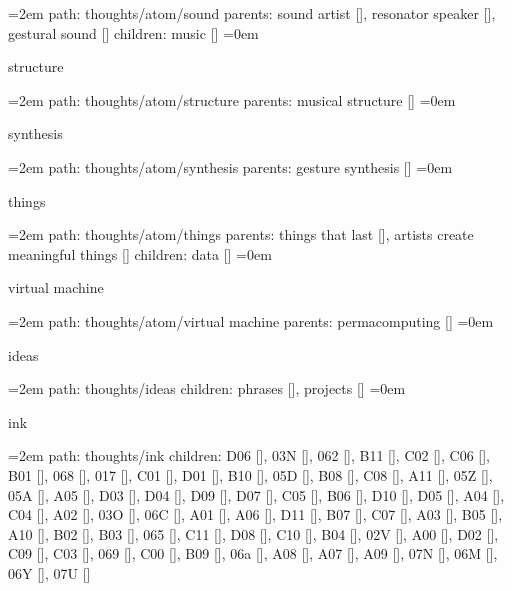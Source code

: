 \leftskip=2em
path: thoughts/atom/sound
\smallskip
parents:  sound artist [], resonator speaker [], gestural sound []
\smallskip
children: music []
\smallskip
\leftskip=0em
\par\endgroup
\bigskip
{}
structure
\smallskip
\par\begingroup
\leftskip=2em
path: thoughts/atom/structure
\smallskip
parents:  musical structure []
\smallskip
\leftskip=0em
\par\endgroup
\bigskip
{}
synthesis
\smallskip
\par\begingroup
\leftskip=2em
path: thoughts/atom/synthesis
\smallskip
parents:  gesture synthesis []
\smallskip
\leftskip=0em
\par\endgroup
\bigskip
{}
things
\smallskip
\par\begingroup
\leftskip=2em
path: thoughts/atom/things
\smallskip
parents:  things that last [], artists create meaningful things []
\smallskip
children: data []
\smallskip
\leftskip=0em
\par\endgroup
\bigskip
{}
virtual machine
\smallskip
\par\begingroup
\leftskip=2em
path: thoughts/atom/virtual machine
\smallskip
parents:  permacomputing []
\smallskip
\leftskip=0em
\par\endgroup
\bigskip
{}
ideas
\smallskip
\par\begingroup
\leftskip=2em
path: thoughts/ideas
\smallskip
children: phrases [], projects []
\smallskip
\leftskip=0em
\par\endgroup
\bigskip
{}
ink
\smallskip
\par\begingroup
\leftskip=2em
path: thoughts/ink
\smallskip
children: D06 [], 03N [], 062 [], B11 [], C02 [], C06 [], B01 [], 068 [], 017 [], C01 [], D01 [], B10 [], 05D [], B08 [], C08 [], A11 [], 05Z [], 05A [], A05 [], D03 [], D04 [], D09 [], D07 [], C05 [], B06 [], D10 [], D05 [], A04 [], C04 [], A02 [], 03O [], 06C [], A01 [], A06 [], D11 [], B07 [], C07 [], A03 [], B05 [], A10 [], B02 [], B03 [], 065 [], C11 [], D08 [], C10 [], B04 [], 02V [], A00 [], D02 [], C09 [], C03 [], 069 [], C00 [], B09 [], 06a [], A08 [], A07 [], A09 [], 07N [], 06M [], 06Y [], 07U []
